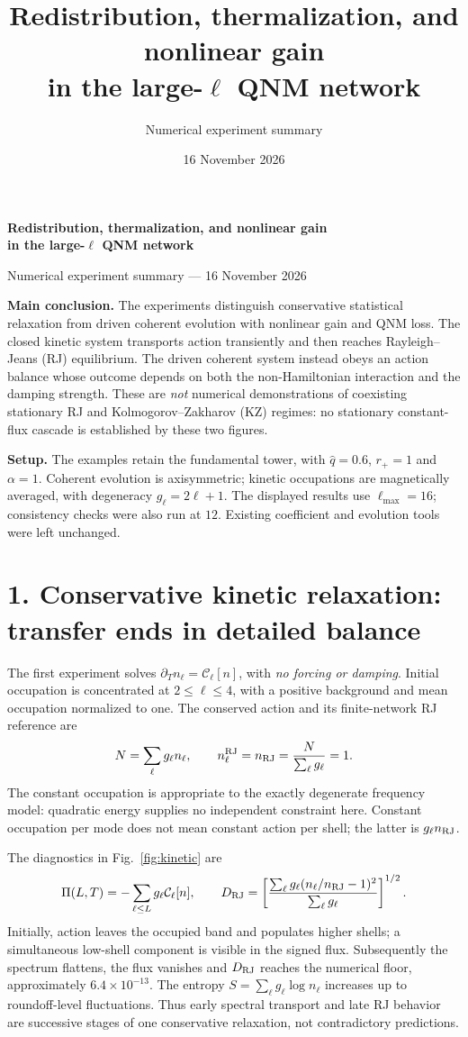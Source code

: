 \documentclass[10pt,a4paper]{article}
\title{Redistribution, thermalization, and nonlinear gain\\in the large-$\ell$ QNM network}
\author{Numerical experiment summary}
\date{16 November 2026}
\begin{document}
\begin{center}
{\large\bfseries Redistribution, thermalization, and nonlinear gain\\
in the large-$\ell$ QNM network}\par
\small Numerical experiment summary --- 16 November 2026
\end{center}

\textbf{Main conclusion.}
The experiments distinguish conservative statistical relaxation from driven
coherent evolution with nonlinear gain and QNM loss. The closed kinetic system
transports action transiently and then reaches Rayleigh--Jeans (RJ) equilibrium.
The driven coherent system instead obeys an action balance whose outcome depends
on both the non-Hamiltonian interaction and the damping strength.
These are \emph{not} numerical demonstrations of coexisting stationary RJ and
Kolmogorov--Zakharov (KZ) regimes: no stationary constant-flux cascade is
established by these two figures.

\textbf{Setup.}
The examples retain the fundamental tower, with $\hat q=0.6$, $r_+=1$ and
$\alpha=1$. Coherent evolution is axisymmetric; kinetic occupations are
magnetically averaged, with degeneracy $g_\ell=2\ell+1$.
The displayed results use $\ell_{\max}=16$; consistency checks were also run at
$12$. Existing coefficient and evolution tools were left unchanged.

\section*{1. Conservative kinetic relaxation: transfer ends in detailed balance}
The first experiment solves $\partial_T n_\ell=\mathcal C_\ell[n]$, with
\emph{no forcing or damping}. Initial occupation is concentrated at
$2\le\ell\le4$, with a positive background and mean occupation normalized to one.
The conserved action and its finite-network RJ reference are
\begin{equation}
 N=\sum_\ell g_\ell n_\ell,\qquad
 n_\ell^{\rm RJ}=n_{\rm RJ}=\frac{N}{\sum_\ell g_\ell}=1.
\end{equation}
The constant occupation is appropriate to the exactly degenerate frequency
model: quadratic energy supplies no independent constraint here. Constant
occupation per mode does not mean constant action per shell; the latter is
$g_\ell n_{\rm RJ}$.

The diagnostics in Fig.~\ref{fig:kinetic} are
\begin{equation}
 \Pi(L,T)=-\sum_{\ell\le L}g_\ell\mathcal C_\ell[n],\qquad
 D_{\rm RJ}=\left[\frac{\sum_\ell g_\ell(n_\ell/n_{\rm RJ}-1)^2}
 {\sum_\ell g_\ell}\right]^{1/2}.
\end{equation}
Initially, action leaves the occupied band and populates higher shells; a
simultaneous low-shell component is visible in the signed flux. Subsequently
the spectrum flattens, the flux vanishes and $D_{\rm RJ}$ reaches the numerical
floor, approximately $6.4\times10^{-13}$. The entropy
$S=\sum_\ell g_\ell\log n_\ell$ increases up to roundoff-level fluctuations.
Thus early spectral transport and late RJ behavior are successive stages of
one conservative relaxation, not contradictory predictions.
\end{document}
